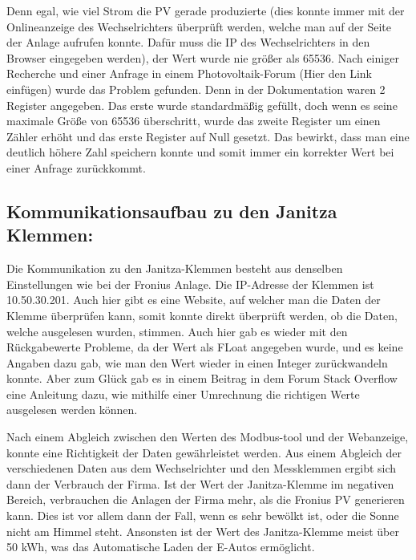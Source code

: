 Denn egal, wie viel Strom die PV gerade produzierte (dies konnte immer mit der Onlineanzeige des Wechselrichters überprüft werden, welche man auf der Seite der Anlage aufrufen konnte. Dafür muss die IP des Wechselrichters in den Browser eingegeben werden), der Wert wurde nie größer als 65536. Nach einiger Recherche und einer Anfrage in einem Photovoltaik-Forum (Hier den Link einfügen) wurde das Problem gefunden. Denn in der Dokumentation waren 2 Register angegeben. Das erste wurde standardmäßig gefüllt, doch wenn es seine maximale Größe von 65536 überschritt, wurde das zweite Register um einen Zähler erhöht und das erste Register auf Null gesetzt. Das bewirkt, dass man eine deutlich höhere Zahl speichern konnte und somit immer ein korrekter Wert bei einer Anfrage zurückkommt. 

\subsection{Kommunikationsaufbau zu den Janitza Klemmen: } \label{text:Janitza}

Die Kommunikation zu den Janitza-Klemmen besteht aus denselben Einstellungen wie bei der Fronius Anlage. Die IP-Adresse der Klemmen ist 10.50.30.201. Auch hier gibt es eine Website, auf welcher man die Daten der Klemme überprüfen kann, somit konnte direkt überprüft werden, ob die Daten, welche ausgelesen wurden, stimmen. Auch hier gab es wieder mit den Rückgabewerte Probleme, da der Wert als FLoat angegeben wurde, und es keine Angaben dazu gab, wie man den Wert wieder in einen Integer zurückwandeln konnte. Aber zum Glück gab es in einem Beitrag in dem Forum Stack Overflow eine Anleitung dazu, wie mithilfe einer Umrechnung die richtigen Werte ausgelesen werden können.  

Nach einem Abgleich zwischen den Werten des Modbus-tool und der Webanzeige, konnte eine Richtigkeit der Daten gewährleistet werden. Aus einem Abgleich der verschiedenen Daten aus dem Wechselrichter und den Messklemmen ergibt sich dann der Verbrauch der Firma. Ist der Wert der Janitza-Klemme im negativen Bereich, verbrauchen die Anlagen der Firma mehr, als die Fronius PV generieren kann. Dies ist vor allem dann der Fall, wenn es sehr bewölkt ist, oder die Sonne nicht am Himmel steht. Ansonsten ist der Wert des Janitza-Klemme meist über 50 kWh, was das Automatische Laden der E-Autos ermöglicht.  

